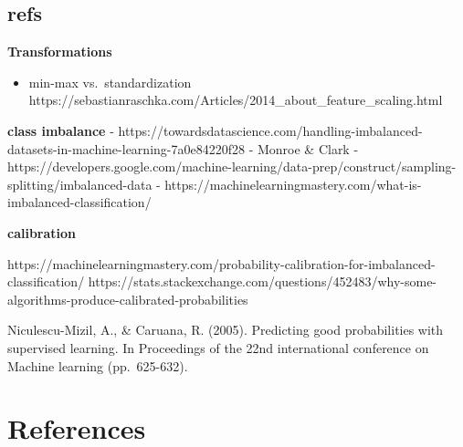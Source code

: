 \documentclass[
  letterpaper,
]{krantz}
\providecommand{\tightlist}{%
  \setlength{\itemsep}{0pt}\setlength{\parskip}{0pt}}\usepackage{longtable,booktabs,array}
\begin{document}
\section{refs}\label{refs-4}

\textbf{Transformations}

\begin{itemize}
\tightlist
\item
  min-max vs.~standardization
  https://sebastianraschka.com/Articles/2014\_about\_feature\_scaling.html
\end{itemize}

\textbf{class imbalance} -
https://towardsdatascience.com/handling-imbalanced-datasets-in-machine-learning-7a0e84220f28
- Monroe \& Clark -
https://developers.google.com/machine-learning/data-prep/construct/sampling-splitting/imbalanced-data
- https://machinelearningmastery.com/what-is-imbalanced-classification/

\textbf{calibration}

https://machinelearningmastery.com/probability-calibration-for-imbalanced-classification/
https://stats.stackexchange.com/questions/452483/why-some-algorithms-produce-calibrated-probabilities

Niculescu-Mizil, A., \& Caruana, R. (2005). Predicting good
probabilities with supervised learning. In Proceedings of the 22nd
international conference on Machine learning (pp.~625-632).

\cleardoublepage
{}
{}
\appendix

\chapter{References}\label{references}
\end{document}
